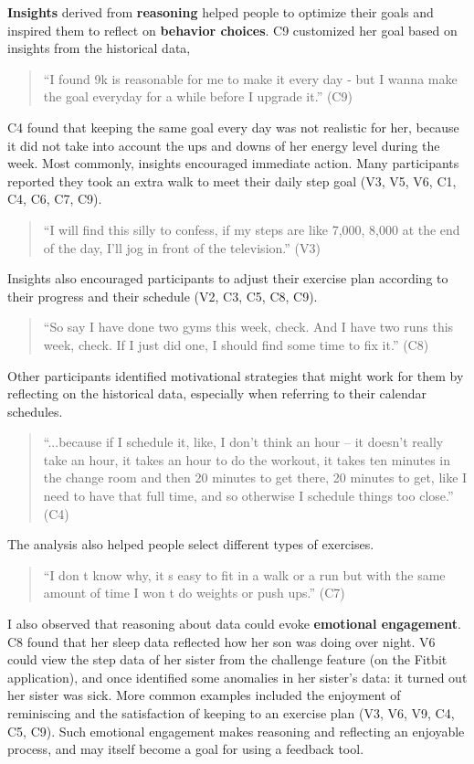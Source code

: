 \documentclass[12pt,oneside]{book}
\begin{document}
\textbf{Insights} derived from \textbf{reasoning} helped people to optimize their goals and inspired them to reflect on \textbf{behavior choices}. C9 customized her goal based on insights from the historical data,
\begin{quote} ``I found 9k is reasonable for me to make it every day - but I wanna make the goal everyday for a while before I upgrade it.'' (C9)
\end{quote}	
C4 found that keeping the same goal every day was not realistic for her, because it did not take into account the ups and downs of her energy level during the week. Most commonly, insights encouraged immediate action. Many participants reported they took an extra walk to meet their daily step goal (V3, V5, V6, C1, C4, C6, C7, C9). 
\begin{quote}
``I will find this silly to confess, if my steps are like 7,000, 8,000 at the end of the day, I{\rq}ll jog in front of the television.'' (V3)
\end{quote}
 Insights also encouraged participants to adjust their exercise plan according to their progress and their schedule (V2, C3, C5, C8, C9). 
\begin{quote}
``So say I have done two gyms this week, check. And I have two runs this week, check. If I just did one, I should find some time to fix it.'' (C8)
\end{quote}
 Other participants identified motivational strategies that might work for them by reflecting on the historical data, especially when referring to their calendar schedules. 
 \begin{quote}
``...because if I schedule it, like, I don't think an hour -- it doesn't really take an hour, it takes an hour to do the workout, it takes ten minutes in the change room and then 20 minutes to get there, 20 minutes to get, like I need to have that full time, and so otherwise I schedule things too close.'' (C4)
\end{quote}
The analysis also helped people select different types of exercises. 
\begin{quote}
``I don t know why, it s easy to fit in a walk or a run but with the same amount of time I won t do weights or push ups.'' (C7)
\end{quote}

I also observed that reasoning about data could evoke \textbf{emotional engagement}. C8 found that her sleep data reflected how her son was doing over night. V6 could view the step data of her sister from the challenge feature (on the Fitbit application), and once identified some anomalies in her sister's data: it turned out her sister was sick. More common examples included the enjoyment of reminiscing and the satisfaction of keeping to an exercise plan (V3, V6, V9, C4, C5, C9). Such emotional engagement makes reasoning and reflecting an enjoyable process, and may itself become a goal for using a feedback tool. 
\end{document}
